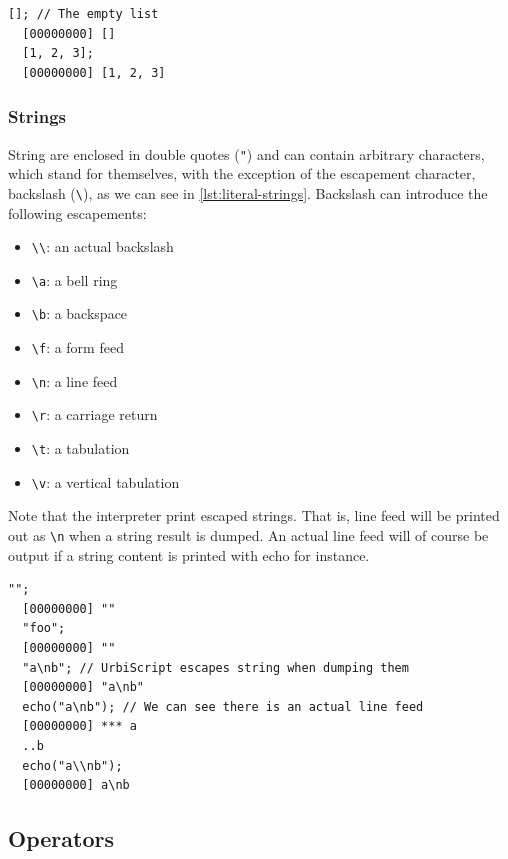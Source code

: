 \documentclass[openright,twoside,12pt]{report}
\newcommand{\lst}[1]{\autoref{lst:#1}}
\begin{document}
\begin{lstlisting}[caption=Literal lists,label=lst:literal-lists,float=htp]
  []; // The empty list
  [00000000] []
  [1, 2, 3];
  [00000000] [1, 2, 3]
\end{lstlisting}

\subsubsection{Strings}

String are enclosed in double quotes (\lstinline|"|) and can contain
arbitrary characters, which stand for themselves, with the exception
of the escapement character, backslash (\lstinline|\|), as we can see
in \lst{literal-strings}. Backslash can introduce the following escapements:

\begin{itemize}
  \item \lstinline |\\|: an actual backslash
  \item \lstinline|\a|: a bell ring
  \item \lstinline|\b|: a backspace
  \item \lstinline|\f|: a form feed
  \item \lstinline|\n|: a line feed
  \item \lstinline|\r|: a carriage return
  \item \lstinline|\t|: a tabulation
  \item \lstinline|\v|: a vertical tabulation
\end{itemize}

Note that the interpreter print escaped strings. That is, line feed
will be printed out as \lstinline|\n| when a string result is
dumped. An actual line feed will of course be output if a string
content is printed with echo for instance.

\begin{lstlisting}[caption=Literal strings,label=lst:literal-strings,float=htp]
  "";
  [00000000] ""
  "foo";
  [00000000] ""
  "a\nb"; // UrbiScript escapes string when dumping them
  [00000000] "a\nb"
  echo("a\nb"); // We can see there is an actual line feed
  [00000000] *** a
  ..b
  echo("a\\nb");
  [00000000] a\nb
\end{lstlisting}

\subsection{Operators}
\end{document}
